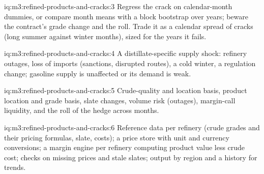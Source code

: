 \begin{solution}{iq:m3:refined-products-and-cracks:3}
Regress the crack on calendar-month dummies, or compare month means with a block
bootstrap over years; beware the contract's grade change and the roll. Trade it as a
calendar spread of cracks (long summer against winter months), sized for the years it
fails.
\end{solution}

\begin{solution}{iq:m3:refined-products-and-cracks:4}
A distillate-specific supply shock: refinery outages, loss of imports (sanctions,
disrupted routes), a cold winter, a regulation change; gasoline supply is unaffected or
its demand is weak.
\end{solution}

\begin{solution}{iq:m3:refined-products-and-cracks:5}
Crude-quality and location basis, product location and grade basis, slate changes,
volume risk (outages), margin-call liquidity, and the roll of the hedge across months.
\end{solution}

\begin{solution}{iq:m3:refined-products-and-cracks:6}
Reference data per refinery (crude grades and their pricing formulas, slate, costs); a
price store with unit and currency conversions; a margin engine per refinery computing
product value less crude cost; checks on missing prices and stale slates; output by
region and a history for trends.
\end{solution}
